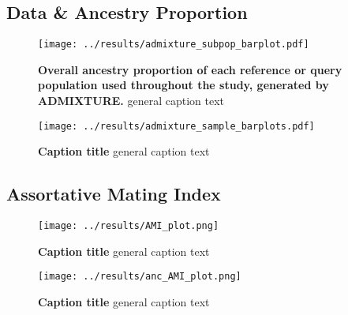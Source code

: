 \documentclass[11pt]{article}
\begin{document}



\subsection{Data \& Ancestry Proportion}


\begin{figure}[htb!]%
    \centering
    \texttt{[image: 
        ../results/admixture\_subpop\_barplot.pdf]} 
    \caption{\textbf{
        Overall ancestry proportion of each reference or query population used throughout the study, generated by ADMIXTURE.
    }
        general caption text
    }
\end{figure}




\begin{figure}[htb!]%
    \centering
    \texttt{[image: 
        ../results/admixture\_sample\_barplots.pdf]} 
    \caption{\textbf{
        Caption title
    }
        general caption text
    }
\end{figure}





\subsection{Assortative Mating Index}


\begin{figure}[htb!]%
    \centering
    \texttt{[image: ../results/AMI\_plot.png]} 
    \caption{\textbf{
        Caption title
    }
        general caption text
    }
\end{figure}



\begin{figure}[htb!]%
    \centering
    \texttt{[image: ../results/anc\_AMI\_plot.png]} 
    \caption{\textbf{
        Caption title
    }
        general caption text
    }
\end{figure}



\end{document}
